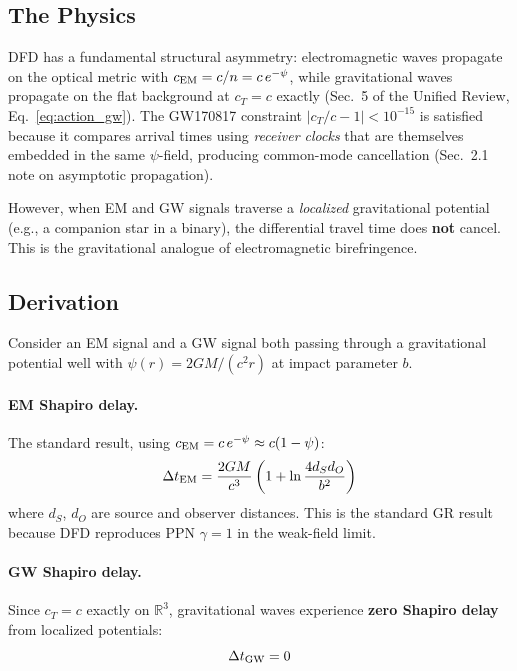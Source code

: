 \documentclass[11pt]{article}
\begin{document}
\subsection{The Physics}

DFD has a fundamental structural asymmetry: electromagnetic waves propagate on the
optical metric with $c_{\rm EM} = c/n = c\,e^{-\psi}$, while gravitational waves
propagate on the flat background at $c_T = c$ exactly (Sec.~5 of the Unified Review,
Eq.~\eqref{eq:action_gw}). The GW170817 constraint $|c_T/c - 1| < 10^{-15}$ is
satisfied because it compares arrival times using \emph{receiver clocks} that are
themselves embedded in the same $\psi$-field, producing common-mode cancellation
(Sec.~2.1 note on asymptotic propagation).

However, when EM and GW signals traverse a \emph{localized} gravitational potential
(e.g., a companion star in a binary), the differential travel time does \textbf{not}
cancel. This is the gravitational analogue of electromagnetic birefringence.

\subsection{Derivation}

Consider an EM signal and a GW signal both passing through a gravitational potential
well with $\psi(r) = 2GM/(c^2 r)$ at impact parameter $b$.

\paragraph{EM Shapiro delay.} The standard result, using $c_{\rm EM} = c\,e^{-\psi}
\approx c(1 - \psi)$:
\begin{equation}
\Delta t_{\rm EM} = \frac{2GM}{c^3}\left(1 + \ln\frac{4d_S d_O}{b^2}\right)
\end{equation}
where $d_S$, $d_O$ are source and observer distances. This is the standard GR result
because DFD reproduces PPN $\gamma = 1$ in the weak-field limit.

\paragraph{GW Shapiro delay.} Since $c_T = c$ exactly on $\mathbb{R}^3$, gravitational
waves experience \textbf{zero Shapiro delay} from localized potentials:
\begin{equation}
\Delta t_{\rm GW} = 0
\end{equation}
\end{document}
